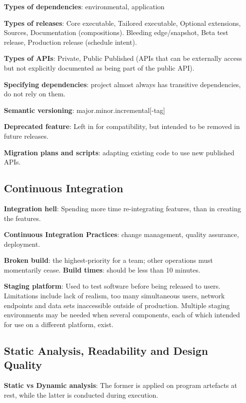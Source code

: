 \documentclass{article}
\begin{document}
\noindent \textbf{Types of dependencies}: environmental, application

\noindent \textbf{Types of releases}: Core executable, Tailored executable, Optional extensions, Sources, Documentation (compositions).
Bleeding edge/snapshot, Beta test release, Production release (schedule intent).

\noindent \textbf{Types of APIs}: Private, Public
Published (APIs that can be externally access but not explicitly documented as being part of the public API).

\noindent \textbf{Specifying dependencies}: project almost always has transitive dependencies, do not rely on them.

\noindent \textbf{Semantic versioning}: major.minor.incremental[-tag]

\noindent \textbf{Deprecated feature}: Left in for compatibility, but intended to be removed in future releases.

\noindent \textbf{Migration plans and scripts}: adapting existing code to use new published APIs.


\subsection*{Continuous Integration}

\noindent \textbf{Integration hell}: Spending more time re-integrating features, than in creating the features.

\noindent \textbf{Continuous Integration Practices}: change management, quality assurance, deployment.

\noindent \textbf{Broken build}: the highest-priority for a team; other operations must momentarily cease.
\noindent \textbf{Build times}: should be less than 10 minutes.

\noindent \textbf{Staging platform}: Used to test software before being released to users.
Limitations include lack of realism, too many simultaneous users, network endpoints and data sets inaccessible outside of production.
Multiple staging environments may be needed when several components, each of which intended for use on a different platform, exist.


\subsection*{Static Analysis, Readability and Design Quality}

\noindent \textbf{Static vs Dynamic analysis}: The former is applied on program artefacts at rest, while the latter is conducted during execution.
\end{document}
